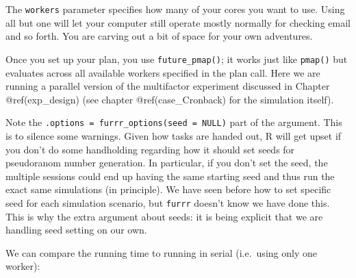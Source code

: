 \documentclass[
]{book}
\newenvironment{Shaded}{\begin{snugshade}}{\end{snugshade}}
\newcommand{\AttributeTok}[1]{\textcolor[rgb]{0.13,0.29,0.53}{#1}}
\newcommand{\ConstantTok}[1]{\textcolor[rgb]{0.56,0.35,0.01}{#1}}
\newcommand{\FunctionTok}[1]{\textcolor[rgb]{0.13,0.29,0.53}{\textbf{#1}}}
\newcommand{\NormalTok}[1]{#1}
\newcommand{\OtherTok}[1]{\textcolor[rgb]{0.56,0.35,0.01}{#1}}
\newcommand{\SpecialCharTok}[1]{\textcolor[rgb]{0.81,0.36,0.00}{\textbf{#1}}}
\begin{document}
The \texttt{workers} parameter specifies how many of your cores you want to use.
Using all but one will let your computer still operate mostly normally for checking email and so forth.
You are carving out a bit of space for your own adventures.

Once you set up your plan, you use \texttt{future\_pmap()}; it works just like \texttt{pmap()} but evaluates across all available workers specified in the plan call.
Here we are running a parallel version of the multifactor experiment discussed in Chapter @ref(exp\_design) (see chapter @ref(case\_Cronback) for the simulation itself).

\begin{Shaded}
\end{Shaded}

Note the \texttt{.options\ =\ furrr\_options(seed\ =\ NULL)} part of the argument.
This is to silence some warnings.
Given how tasks are handed out, R will get upset if you don't do some handholding regarding how it should set seeds for pseudoranom number generation.
In particular, if you don't set the seed, the multiple sessions could end up having the same starting seed and thus run the exact same simulations (in principle).
We have seen before how to set specific seed for each simulation scenario, but \texttt{furrr} doesn't know we have done this.
This is why the extra argument about seeds: it is being explicit that we are handling seed setting on our own.

We can compare the running time to running in serial (i.e.~using only one worker):

\begin{Shaded}
\end{Shaded}
\end{document}
